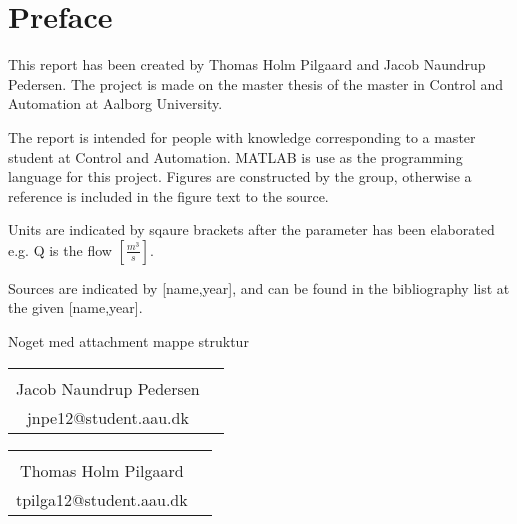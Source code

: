 \chapter*{Preface}
This report has been created by Thomas Holm Pilgaard and Jacob Naundrup Pedersen. The project is made on the master thesis of the master in Control and Automation at Aalborg University. 

The report is intended for people with knowledge corresponding to a master student at Control and Automation. MATLAB is use as the programming language for this project. Figures are constructed by the group, otherwise a reference is included in the figure text to the source.  

Units are indicated by sqaure brackets after the parameter has been elaborated e.g. Q is the flow $\left[\frac{m^3}{s}\right]$. 

Sources are indicated by [name,year], and can be found in the bibliography list at the given
[name,year].

Noget med attachment mappe struktur

\vfill

\begin{table}[H]
	\centering
		\begin{tabular}{c c }
			\underline{\phantom{mmmmmmmmmmmmmmmmmmm}}       \\
			Jacob Naundrup Pedersen \\
			jnpe12@student.aau.dk \\


		\end{tabular}
				\begin{tabular}{c c }
			\underline{\phantom{mmmmmmmmmmmmmmmmmmm}}       \\
			Thomas Holm Pilgaard \\
			tpilga12@student.aau.dk\\

			
		\end{tabular}
		
\end{table}

